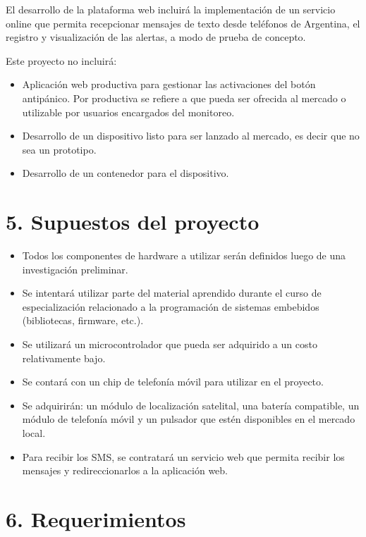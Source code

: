 \documentclass[
11pt, %
]{charter}
\begin{document}
El desarrollo de la plataforma web incluirá la implementación de un servicio online que permita recepcionar mensajes de texto desde teléfonos de Argentina, el registro y visualización de las alertas, a modo de prueba de concepto.

Este proyecto no incluirá:
\begin{itemize}
	\item Aplicación web productiva para gestionar las activaciones del botón antipánico. Por productiva se refiere a que pueda ser ofrecida al mercado o utilizable por usuarios encargados del monitoreo.
	\item Desarrollo de un dispositivo listo para ser lanzado al mercado, es decir que no sea un prototipo.
	\item Desarrollo de un contenedor para el dispositivo.
\end{itemize}

\section{5. Supuestos del proyecto}
\label{sec:supuestos}

\begin{itemize}
	\item Todos los componentes de hardware a utilizar serán definidos luego de una investigación preliminar.
	\item Se intentará utilizar parte del material aprendido durante el curso de especialización relacionado a la programación de sistemas embebidos (bibliotecas, firmware, etc.).
	\item Se utilizará un microcontrolador que pueda ser adquirido a un costo relativamente bajo.
	\item Se contará con un chip de telefonía móvil para utilizar en el proyecto.
	\item Se adquirirán: un módulo de localización satelital, una batería compatible, un módulo de telefonía móvil y un pulsador que estén disponibles en el mercado local.
	\item Para recibir los SMS, se contratará un servicio web que permita recibir los mensajes y redireccionarlos a la aplicación web.

\end{itemize}

\section{6. Requerimientos}
\label{sec:requerimientos}
\end{document}
